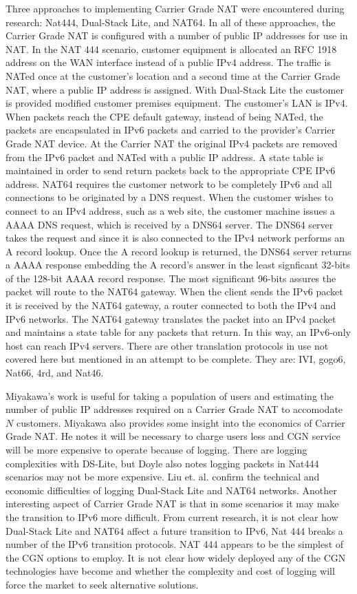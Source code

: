 Three approaches to implementing Carrier Grade NAT were
encountered during research: Nat444, Dual-Stack Lite, and
NAT64.  In all of these approaches,
the Carrier Grade NAT is configured with a number of public IP
addresses for use in NAT.  In the NAT 444 scenario, customer
equipment is allocated an RFC 1918 address on the WAN interface
instead of a public IPv4 address.  The traffic is NATed once at the
customer's location and a second time at the Carrier Grade NAT, where
a public IP address is assigned.  With Dual-Stack Lite the customer
is provided modified customer premises equipment.  The customer's
LAN is IPv4.  When packets reach the CPE default gateway, instead of
being NATed, the packets are encapsulated in IPv6 packets and carried
to the provider's Carrier Grade NAT device.   At the Carrier NAT the
original IPv4 packets are removed from the IPv6 packet and NATed
with a public IP address.  A state table is maintained in order
to send return packets back to the appropriate CPE IPv6 address.
NAT64 requires the customer network to be completely IPv6 and all
connections to be originated by a DNS request.  When the customer
wishes to connect to an IPv4 address, such as a web site, the
customer machine issues a AAAA DNS request, which is received by
a DNS64 server.  The DNS64 server takes the request and since it
is also connected to the IPv4 network performs an A record lookup.
Once the A record lookup is returned, the DNS64 server returns a AAAA
response embedding the A record's answer in the least signficant
32-bits of the 128-bit AAAA record response.  The most significant
96-bits assures the packet will route to the NAT64 gateway.  When the
client sends the IPv6 packet it is received by the NAT64 gateway,
a router connected to both the IPv4 and IPv6 networks.  The NAT64
gateway translates the packet into an IPv4 packet and maintains a
state table for any packets that return.  In this way, an IPv6-only
host can reach IPv4 servers.  There are other translation protocols
in use not covered here but mentioned in an attempt to be complete.
They are: IVI, gogo6, Nat66, 4rd, and Nat46.

Miyakawa's work is useful for taking a population of users and
estimating the number of public IP addresses required on a Carrier
Grade NAT to accomodate $N$ customers.  Miyakawa also provides
some insight into the economics of Carrier Grade NAT.  He notes
it will be necessary to charge users less and CGN service will be
more expensive to operate because of logging.  There are
logging complexities with DS-Lite, 
but Doyle also notes logging packets in
Nat444 scenarios may not be more expensive.  Liu et. al. confirm
the technical and economic difficulties of logging Dual-Stack
Lite and NAT64 networks\cite{Nat03}.  Another interesting aspect
of Carrier Grade NAT is that in some scenarios it may make the
transition to IPv6 more difficult.  From current research, it is
not clear how Dual-Stack Lite and NAT64 affect a future transition
to IPv6, Nat 444 breaks a number of the IPv6 transition protocols.
NAT 444 appears to be the simplest of the CGN options to employ.
It is not clear how widely deployed any of the CGN technologies
have become and whether the complexity and cost of logging will
force the market to seek alternative solutions.

